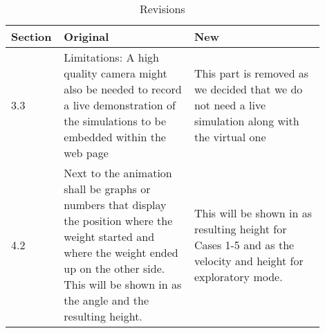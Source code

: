 \begin{table}[H]
  \centering
  \caption{Revisions}
  \label{my-label}
  \begin{tabular}{|p{0.1\linewidth}|p{0.4\linewidth}|p{0.4\linewidth}|}
    \hline
    \textbf{Section} & \textbf{Original} & \textbf{New} \\
    \hline

    3.3 & 
    Limitations: A high quality camera might also be needed to record a live demonstration of the simulations to be embedded within the web page & 
    This part is removed as we decided that we do not need a live simulation along with the virtual one \\
    \hline
    4.2 & 
    Next to the animation shall be graphs or numbers that display the position where the weight started and where the weight ended up on the other side. This will be shown in as the angle and the resulting height. & 
    This will be shown in as resulting height for Cases 1-5 and as the velocity and height for exploratory mode. \\
    \hline
    

  \end{tabular}
\end{table}